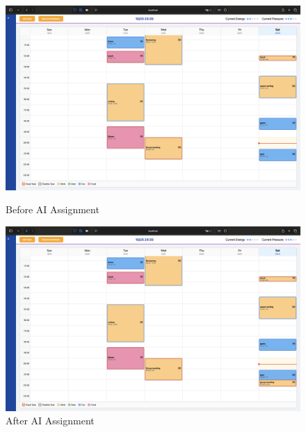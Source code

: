 \documentclass[12pt, a4paper]{article}
\begin{document}
\begin{enumerate}
\begin{itemize}
                            \begin{figure}[H]
                                \begin{minipage}[t]{0.49\textwidth}
                                    \centering
                                    \includegraphics[width=\textwidth]{Images/System/chatbot/bf_ai.png}
                                    \caption{Before AI Assignment}
                                    \label{bf_ai}
                                \end{minipage}
                                \hfill
                                \begin{minipage}[t]{0.49\textwidth}
                                    \centering
                                    \includegraphics[width=\textwidth]{Images/System/chatbot/aft_ai.png}
                                    \caption{After AI Assignment}
                                    \label{aft_ai}
                                \end{minipage}
                            \end{figure}


\end{itemize}
\end{enumerate}
\end{document}
